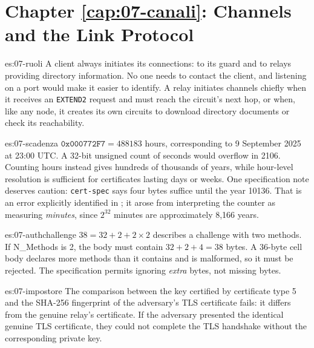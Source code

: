\section*{Chapter \ref{cap:07-canali}: Channels and the Link Protocol}

\begin{soluzione}{es:07-ruoli}
A client always initiates its connections: to its guard and to relays providing directory information. No one needs to contact the client, and listening on a port would make it easier to identify. A relay initiates channels chiefly when it receives an \texttt{EXTEND2} request and must reach the circuit's next hop, or when, like any node, it creates its own circuits to download directory documents or check its reachability.
\end{soluzione}

\begin{soluzione}{es:07-scadenza}
$\texttt{0x000772F7} = 488183$ hours, corresponding to 9 September 2025 at 23:00 UTC. A 32-bit unsigned count of seconds would overflow in 2106. Counting hours instead gives hundreds of thousands of years, while hour-level resolution is sufficient for certificates lasting days or weeks. One specification note deserves caution: \texttt{cert-spec} says four bytes suffice until the year 10136. That is an error explicitly identified in ; it arose from interpreting the counter as measuring \emph{minutes}, since $2^{32}$ minutes are approximately 8,166 years.
\end{soluzione}

\begin{soluzione}{es:07-authchallenge}
$38 = 32 + 2 + 2 \times 2$ describes a challenge with two methods. If N\_Methods is 2, the body must contain $32 + 2 + 4 = 38$ bytes. A 36-byte cell body declares more methods than it contains and is malformed, so it must be rejected. The specification permits ignoring \emph{extra} bytes, not missing bytes.
\end{soluzione}

\begin{soluzione}{es:07-impostore}
The comparison between the key certified by certificate type 5 and the SHA-256 fingerprint of the adversary's TLS certificate fails: it differs from the genuine relay's certificate. If the adversary presented the identical genuine TLS certificate, they could not complete the TLS handshake without the corresponding private key.
\end{soluzione}

